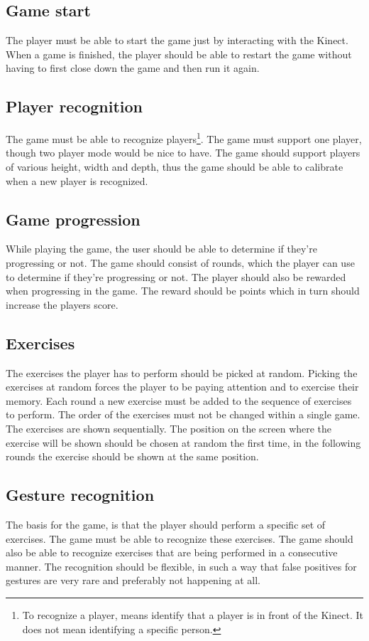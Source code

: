 \documentclass[11pt]{report}
\begin{document}
\subsection{Game start}
The player must be able to start the game just by interacting with the Kinect. When a game is finished, the player should be able to restart the game without having to first close down the game and then run it again.

\subsection{Player recognition}
The game must be able to recognize players\footnote{ To recognize a player, means identify that a player is in front of the Kinect. It does not mean identifying a specific person.}. The game must support one player, though two player mode would be nice to have. The game should support players of various height, width and depth, thus the game should be able to calibrate when a new player is recognized.

\subsection{Game progression}
While playing the game, the user should be able to determine if they're progressing or not. The game should consist of rounds, which the player can use to determine if they're progressing or not. The player should also be rewarded when progressing in the game. The reward should be points which in turn should increase the players score.

\subsection{Exercises}
The exercises the player has to perform should be picked at random. Picking the exercises at random forces the player to be paying attention and to exercise their memory. Each round a new exercise must be added to the sequence of exercises to perform. The order of the exercises must not be changed within a single game. The exercises are shown sequentially. The position on the screen where the exercise will be shown should be chosen at random the first time, in the following rounds the exercise should be shown at the same position.

\subsection{Gesture recognition}
The basis for the game, is that the player should perform a specific set of exercises. The game must be able to recognize these exercises. The game should also be able to recognize exercises that are being performed in a consecutive manner. The recognition should be flexible, in such a way that false positives for gestures are very rare and preferably not happening at all.
\end{document}
